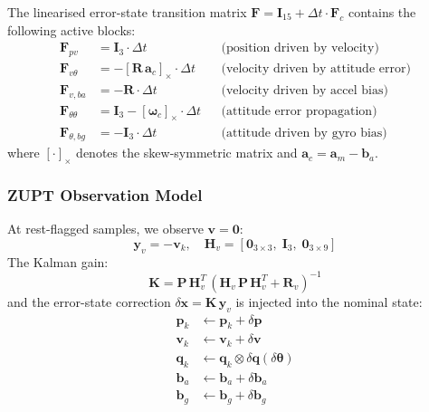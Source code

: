 The linearised error-state transition matrix $\mathbf{F} = \mathbf{I}_{15} + \Delta t \cdot \mathbf{F}_c$ contains the following active blocks:
\begin{align}
  \mathbf{F}_{pv}   &= \mathbf{I}_3 \cdot \Delta t & &\text{(position driven by velocity)} \\
  \mathbf{F}_{v\theta} &= -[\mathbf{R}\,\mathbf{a}_c]_\times \cdot \Delta t & &\text{(velocity driven by attitude error)} \\
  \mathbf{F}_{v,ba}  &= -\mathbf{R} \cdot \Delta t & &\text{(velocity driven by accel bias)} \\
  \mathbf{F}_{\theta\theta} &= \mathbf{I}_3 - [\boldsymbol{\omega}_c]_\times \cdot \Delta t & &\text{(attitude error propagation)} \\
  \mathbf{F}_{\theta,bg} &= -\mathbf{I}_3 \cdot \Delta t & &\text{(attitude driven by gyro bias)}
\end{align}
where $[\cdot]_\times$ denotes the skew-symmetric matrix and $\mathbf{a}_c = \mathbf{a}_m - \mathbf{b}_a$.

\subsubsection{ZUPT Observation Model}

At rest-flagged samples, we observe $\mathbf{v} = \mathbf{0}$:
\begin{equation}
  \mathbf{y}_v = -\mathbf{v}_k, \quad \mathbf{H}_v = [\mathbf{0}_{3\times3},\; \mathbf{I}_3,\; \mathbf{0}_{3\times9}]
\end{equation}
The Kalman gain:
\begin{equation}
  \mathbf{K} = \mathbf{P}\,\mathbf{H}_v^T\,(\mathbf{H}_v\,\mathbf{P}\,\mathbf{H}_v^T + \mathbf{R}_v)^{-1}
\end{equation}
and the error-state correction $\delta\mathbf{x} = \mathbf{K}\,\mathbf{y}_v$ is injected into the nominal state:
\begin{align}
  \mathbf{p}_k &\leftarrow \mathbf{p}_k + \delta\mathbf{p} \\
  \mathbf{v}_k &\leftarrow \mathbf{v}_k + \delta\mathbf{v} \\
  \mathbf{q}_k &\leftarrow \mathbf{q}_k \otimes \delta\mathbf{q}(\delta\boldsymbol{\theta}) \\
  \mathbf{b}_a &\leftarrow \mathbf{b}_a + \delta\mathbf{b}_a \\
  \mathbf{b}_g &\leftarrow \mathbf{b}_g + \delta\mathbf{b}_g
\end{align}

